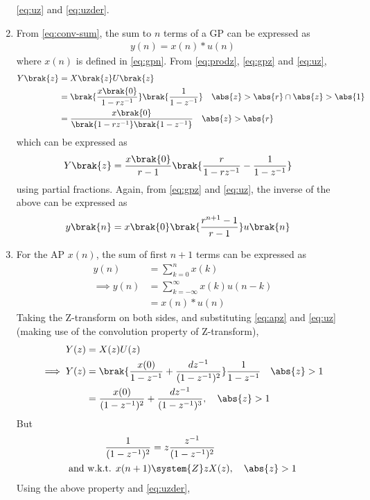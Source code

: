 \begin{enumerate}[label=\thechapter.\arabic*,ref=\thechapter.\theenumi]
	       \eqref{eq:uz}
	       and
	       \eqref{eq:uzder}.
\item From 
	\eqref{eq:conv-sum},  the sum to $n$ terms  of a GP can be expressed as
\begin{align}
	y(n) = x(n)*u(n) 
\end{align}
		where $x(n)$ is defined in 
	       \eqref{eq:gpn}.
From \eqref{eq:prodz}, \eqref{eq:gpz} and \eqref{eq:uz},
\begin{align}
	Y\brak{z}&= X\brak{z} U\brak{z}
	\\
	&=\brak{\frac{x\brak{0}}{1-rz^{-1}}}\brak{\frac{1}{1-z^{-1}}} \quad \abs{z} > \abs{r} \cap \abs{z}>\abs{1}
	\\
	&=\frac{x\brak{0}}{\brak{1-rz^{-1}}\brak{1-z^{-1}}} \quad \abs{z} > \abs{r} 
\end{align}
which can be expressed as
\begin{align}
	Y\brak{z}&=\frac{x\brak{0}}{r-1}\brak{\frac{r}{1-rz^{-1}} - \frac{1}{1-z^{-1}}}
\end{align}
using partial fractions.  Again, from \eqref{eq:gpz} and \eqref{eq:uz}, the inverse of the above can be expressed as
\begin{align}
	y\brak{n}
	&=x\brak{0}\brak{\frac{r^{n+1}-1}{r-1}}u\brak{n}
\end{align}
\item For the AP $x(n)$, the sum of first $n+1$ terms can be expressed as
\begin{align}
y(n) &= \sum_{k=0}^{n} x(k)\\
\implies y(n) &= \sum_{k=-\infty}^{\infty} x(k) u(n-k)\\
&= x(n) * u(n)
\end{align}
Taking the Z-transform on both sides, and substituting \eqref{eq:apz} and \eqref{eq:uz} (making use of the convolution property of Z-transform),
\begin{align}
Y(z) &= X(z) U(z)\\
\implies Y(z) &= \brak{\frac{x(0)}{1-z^{-1}} + \frac{dz^{-1}}{(1-z^{-1})^{2}}}\frac{1}{1-z^{-1}} \quad \abs{z} > 1 \\
&= \frac{x(0)}{({1-z^{-1}})^2} + \frac{dz^{-1}}{(1-z^{-1})^{3}}, \quad \abs{z} > 1 \label{eq:APSum}
\end{align}
But
\begin{align}
\frac{1}{({1-z^{-1}})^2} &= z\frac{z^{-1}}{({1-z^{-1}})^2}\\
\text{and w.k.t. } x(n+1) &\system{Z} zX(z), \quad \abs{z} > 1 
\end{align}
Using the above property and \eqref{eq:uzder}, 

\end{enumerate}
